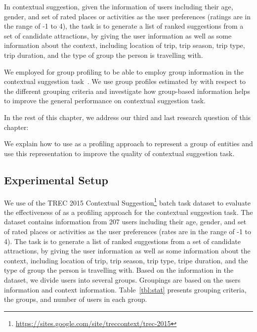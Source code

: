 In contextual suggestion, given the information of users including their age, gender, and set of rated places or activities as the user preferences (ratings are in the range of -1 to 4), the task is to generate a list of ranked suggestions from a set of candidate attractions, by giving the user information as well as some information about the context, including location of trip, trip season, trip type, trip duration, and the type of group the person is travelling with.

We employed \acswlm for group profiling to be able to employ group information in the contextual suggestion task~\citep{Dehghani2016:trec,Dehghani:2016:CHIIR,Hashemi:2015}. We use group profiles estimated by \acswlm with respect to the different grouping criteria and investigate how group-based information helps to improve the general performance on contextual suggestion task. 

In the rest of this chapter, we address our third and last research question of this chapter: 

We explain how to use \acswlm as a profiling approach to represent a group of entities and use this representation to improve the quality of contextual suggestion task.

\subsection{Experimental Setup}
\label{sec:cs_exp}

We use of the TREC 2015 Contextual Suggestion\footnote{\url{https://sites.google.com/site/treccontext/trec-2015}} batch task dataset to evaluate the effectiveness of \acswlm as a profiling approach for the contextual suggestion task. The dataset contains information from 207 users including their age, gender, and set of rated places or activities as the user preferences (rates are in the range of -1 to 4). 
The task is to generate a list of ranked suggestions from a set of candidate attractions, by giving the user information as well as some information about the context, including location of trip, trip season, trip type, tripe duration, and the type of group the person is travelling with. Based on the information in the dataset, we divide users into several groups. Groupings are based on the users information and context information. Table~\ref{tbl:stat} presents grouping criteria, the groups, and number of users in each group.

